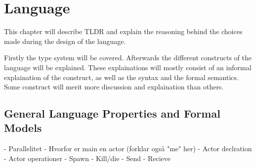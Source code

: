 \chapter{Language}\label{part:design}

This chapter will describe TLDR and explain the reasoning behind the choices made during the design of the language. 

Firstly the type system will be covered. Afterwards the different constructs of the language will be explained. These explainations will mostly consist of an informal explaination of the construct, as well as the syntax and the formal semantics. Some construct will merit more discussion and explaination than others.

\section{General Language Properties and Formal Models}






   - Parallelitet
   - Hvorfor er main en actor (forklar også "me" her)
   - Actor declration
   - Actor operationer
     - Spawn
     - Kill/die
     - Send
     - Recieve

